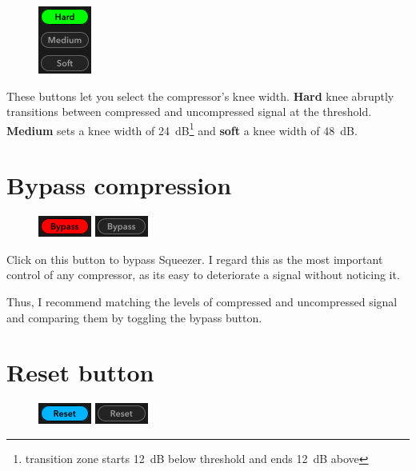 \begin{figure}
  \includegraphics[scale=\screenshotscale,clip]{include/images/buttons_knee_width.png}
\end{figure}

These buttons let you select the compressor's knee width.
\textbf{Hard} knee abruptly transitions between compressed and
uncompressed signal at the threshold.  \textbf{Medium} sets a knee
width of \SI{24}{\dB}\footnote{transition zone starts \SI{12}{\dB}
  below threshold and ends \SI{12}{\dB} above} and \textbf{soft} a
knee width of \SI{48}{\dB}.

\section{Bypass compression}

\begin{figure}
  \includegraphics[scale=\screenshotscale,clip]{include/images/button_bypass_on.png}
  \newline \vspace{-0.9\baselineskip}
  \includegraphics[scale=\screenshotscale,clip]{include/images/button_bypass_off.png}
\end{figure}

Click on this button to bypass Squeezer.  I regard this as the most
important control of any compressor, as its easy to deteriorate a
signal without noticing it.

Thus, I recommend matching the levels of compressed and uncompressed
signal and comparing them by toggling the bypass button.

\section{Reset button}

\begin{figure}
  \includegraphics[scale=\screenshotscale,clip]{include/images/button_reset_on.png}
  \newline \vspace{-0.9\baselineskip}
  \includegraphics[scale=\screenshotscale,clip]{include/images/button_reset_off.png}
\end{figure}

